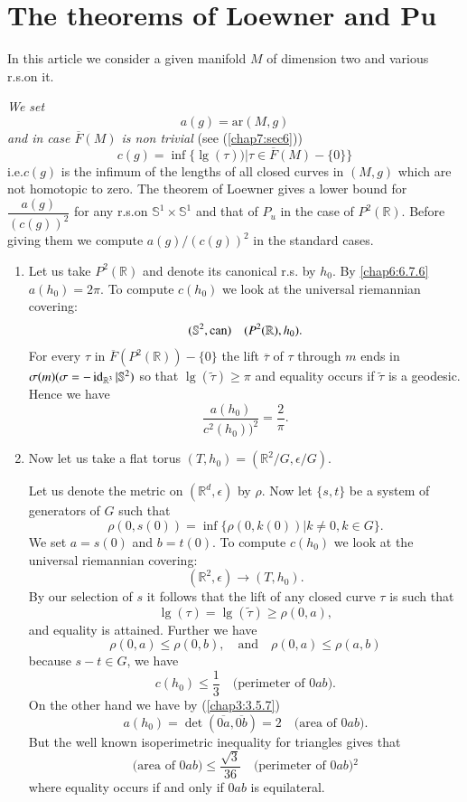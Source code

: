 \section{The theorems of Loewner and Pu}\label{chap8:sec12}

In this article we consider a given manifold $M$ of dimension two and
various r.s.\@ on it.

{\em We set}
$$
a(g)=\text{ar}(M,g)
$$
{\em and \pageoriginale in case $\overline{F}(M)$ is non trivial} (see
(\ref{chap7:sec6}))  
$$
c(g)=\inf\{\lg(\tau))|\tau\in\overline{F}(M)-\{0\}\}
$$
i.e.\@ $c(g)$ is the infimum of the lengths of all closed curves in
$(M,g)$ which are not homotopic to zero. The theorem of Loewner gives
a lower bound for $\dfrac{a(g)}{(c(g))^{2}}$ for any r.s.\@ on
$\mathbb{S}^{1}\times \mathbb{S}^{1}$ and that of $P_{u}$ in the case
of $P^{2}(\mathbb{R})$. Before giving them we compute
$a(g)/(c(g))^{2}$ in the standard cases.
\begin{enumerate}
\renewcommand{\theenumi}{\Alph{enumi}}
\renewcommand{\labelenumi}{\theenumi)}
\item Let us take $P^{2}(\mathbb{R})$ and denote its canonical r.s.\@
  by $h_{0}$. By \eqref{chap6:6.7.6} $a(h_{0})=2\pi$. To compute $c(h_{0})$
  we look at the universal riemannian covering:
$$
(\mathbb{S}^{2},\operatorname{can})\quad (P^{2}(\mathbb{R}),h_{0}).
$$
For every $\tau$ in $\overline{F}(P^{2}(\mathbb{R}))-\{0\}$ the lift
$\overline{\tau}$ of $\tau$ through $m$ ends in
$\sigma(m)(\sigma=-\operatorname{id}_{\mathbb{R}^{3}}|\mathbb{S}^{2})$ so that
$\lg(\widetilde{\tau})\geq \pi$ and equality occurs if
$\widetilde{\tau}$ is a geodesic. Hence we have
\begin{equation*}
\frac{a(h_{0})}{c^{2}(h_{0}))^{2}}=\frac{2}{\pi}.\tag{8.12.1}\label{chap8:8.12.1}
\end{equation*}

\item Now let us take a flat torus
  $(T,h_{0})=(\mathbb{R}^{2}/G,\epsilon/G)$.

Let us denote the metric on $(\mathbb{R}^{d},\epsilon)$ by $\rho$. Now
let $\{s,t\}$ be a system of generators of $G$ such that
$$
\rho(0,s(0))=\inf\{\rho(0,k(0))|k\neq 0, k\in G\}.
$$
We set $a=s(0)$ and $b=t(0)$. To compute $c(h_{0})$ we look at the
universal riemannian covering:
$$
(\mathbb{R}^{2},\epsilon)\to (T,h_{0}).
$$
By our selection of $s$ it follows that the lift of any closed curve
$\tau$ is such that
$$
\lg(\tau)=\lg(\widetilde{\tau})\geq \rho(0,a),
$$
and \pageoriginale equality is attained. Further we have
$$
\rho(0,a)\leq \rho(0,b),\quad\text{and}\quad \rho(0,a)\leq \rho(a,b)
$$
because $s-t\in G$, we have
$$
c(h_{0})\leq \frac{1}{3}\quad\text{(perimeter of $0ab$)}.
$$
On the other hand we have by {(\ref{chap3:3.5.7})}
$$
a(h_{0})=\det(\overline{0a},\overline{0b})=2\quad\text{(area of
  $0ab$)}.
$$
But the well known isoperimetric inequality for triangles gives that
\begin{equation*}
\text{(area of $0ab$)}\leq \frac{\sqrt{3}}{36}\quad\text{(perimeter of
  $0ab$)$^{2}$}\tag{8.12.2}\label{chap8:8.12.2} 
\end{equation*}
where equality occurs if and only if $0ab$ is equilateral.
\end{enumerate}

